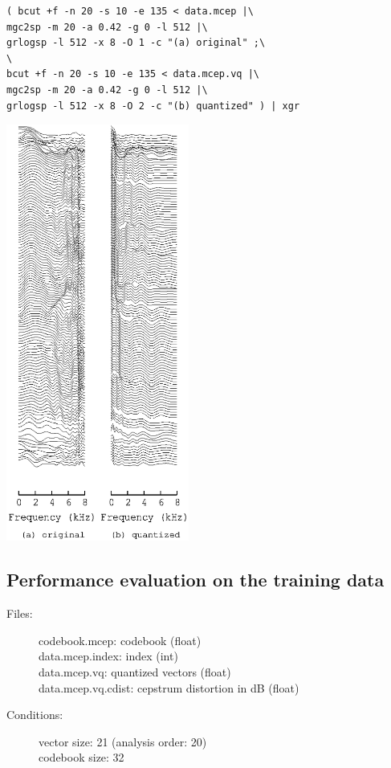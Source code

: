 \documentclass[a4paper,10pt]{article}
\begin{document}
\begin{verbatim}
( bcut +f -n 20 -s 10 -e 135 < data.mcep |\
mgc2sp -m 20 -a 0.42 -g 0 -l 512 |\
grlogsp -l 512 -x 8 -O 1 -c "(a) original" ;\
\
bcut +f -n 20 -s 10 -e 135 < data.mcep.vq |\
mgc2sp -m 20 -a 0.42 -g 0 -l 512 |\
grlogsp -l 512 -x 8 -O 2 -c "(b) quantized" ) | xgr
\end{verbatim}

\includegraphics[width=6cm]{eps/data.mcep.vq.grlogsp.eps}

\subsection{Performance evaluation on the training data}

\begin{description}
\item[Files:]
   codebook.mcep: codebook (float)\\
   data.mcep.index: index (int)\\
   data.mcep.vq: quantized vectors (float)\\
   data.mcep.vq.cdist: cepstrum distortion in dB (float)
\item[Conditions:]
   vector size: 21 (analysis order: 20)\\
   codebook size: 32
\end{description}
\end{document}
